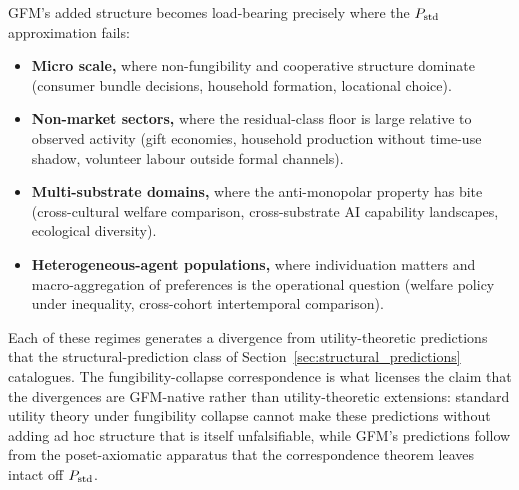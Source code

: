 GFM's added structure becomes load-bearing precisely where the
$P_{\mathrm{std}}$ approximation fails:
\begin{itemize}
\item \textbf{Micro scale,} where non-fungibility and cooperative
  structure dominate (consumer bundle decisions, household
  formation, locational choice).
\item \textbf{Non-market sectors,} where the residual-class floor is
  large relative to observed activity (gift economies,
  household production without time-use shadow, volunteer labour
  outside formal channels).
\item \textbf{Multi-substrate domains,} where the anti-monopolar
  property has bite (cross-cultural welfare comparison,
  cross-substrate AI capability landscapes, ecological diversity).
\item \textbf{Heterogeneous-agent populations,} where individuation
  matters and macro-aggregation of preferences is the operational
  question (welfare policy under inequality, cross-cohort
  intertemporal comparison).
\end{itemize}
Each of these regimes generates a divergence from utility-theoretic
predictions that the structural-prediction class of
Section~\ref{sec:structural_predictions} catalogues.  The
fungibility-collapse correspondence is what licenses the claim that
the divergences are GFM-native rather than utility-theoretic
extensions: standard utility theory under fungibility collapse
cannot make these predictions without adding ad hoc structure that
is itself unfalsifiable, while GFM's predictions follow from the
poset-axiomatic apparatus that the correspondence theorem leaves
intact off $P_{\mathrm{std}}$.
